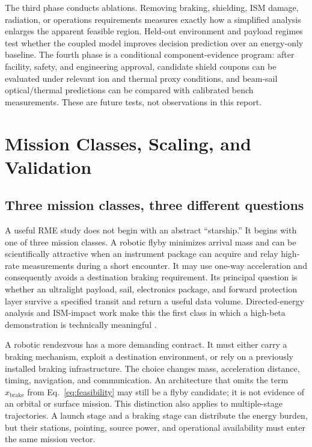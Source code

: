 \documentclass[conference]{../../../../Conference-LaTeX-template_10-17-19/IEEEtran}
\begin{document}
The third phase conducts ablations. Removing braking, shielding, ISM damage, radiation, or operations requirements measures exactly how a simplified analysis enlarges the apparent feasible region. Held-out environment and payload regimes test whether the coupled model improves decision prediction over an energy-only baseline. The fourth phase is a conditional component-evidence program: after facility, safety, and engineering approval, candidate shield coupons can be evaluated under relevant ion and thermal proxy conditions, and beam-sail optical/thermal predictions can be compared with calibrated bench measurements. These are future tests, not observations in this report.

\section{Mission Classes, Scaling, and Validation}
\subsection{Three mission classes, three different questions}
A useful RME study does not begin with an abstract ``starship.'' It begins with one of three mission classes. A robotic flyby minimizes arrival mass and can be scientifically attractive when an instrument package can acquire and relay high-rate measurements during a short encounter. It may use one-way acceleration and consequently avoids a destination braking requirement. Its principal question is whether an ultralight payload, sail, electronics package, and forward protection layer survive a specified transit and return a useful data volume. Directed-energy analysis and ISM-impact work make this the first class in which a high-beta demonstration is technically meaningful \cite{kulkarni2018,hoang2017}.

A robotic rendezvous has a more demanding contract. It must either carry a braking mechanism, exploit a destination environment, or rely on a previously installed braking infrastructure. The choice changes mass, acceleration distance, timing, navigation, and communication. An architecture that omits the term $x_{\mathrm{brake}}$ from Eq.~\eqref{eq:feasibility} may still be a flyby candidate; it is not evidence of an orbital or surface mission. This distinction also applies to multiple-stage trajectories. A launch stage and a braking stage can distribute the energy burden, but their stations, pointing, source power, and operational availability must enter the same mission vector.
\end{document}
